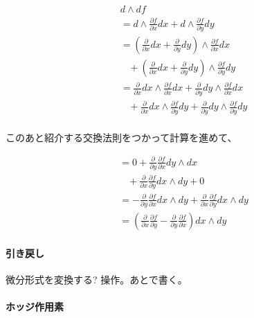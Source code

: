 \begin{equation*}
\begin{split}
&d \wedge df \\
&= d \wedge \frac{\partial f}{\partial x} dx + d \wedge \frac{\partial f}{\partial y} dy \\
&= (\frac{\partial}{\partial x} dx + \frac{\partial}{\partial y} dy) \wedge \frac{\partial f}{\partial x} dx \\
& \; \; \; + (\frac{\partial}{\partial x} dx + \frac{\partial}{\partial y} dy) \wedge \frac{\partial f}{\partial y} dy \\
&= \frac{\partial}{\partial x} dx \wedge \frac{\partial f}{\partial x} dx 
+ \frac{\partial}{\partial y} dy \wedge \frac{\partial f}{\partial x} dx \\
& \; \; \; + \frac{\partial}{\partial x} dx \wedge \frac{\partial f}{\partial y} dy 
+ \frac{\partial}{\partial y} dy \wedge \frac{\partial f}{\partial y} dy \\
\end{split}
\end{equation*}

このあと紹介する交換法則をつかって計算を進めて、

\begin{equation*}
\begin{split}
&= 0 + \frac{\partial}{\partial y} \frac{\partial f}{\partial x} dy \wedge dx \\
& \; \; \; + \frac{\partial}{\partial x} \frac{\partial f}{\partial y} dx \wedge dy + 0 \\
&= - \frac{\partial}{\partial y} \frac{\partial f}{\partial x} dx \wedge dy + \frac{\partial}{\partial x} \frac{\partial f}{\partial y} dx \wedge dy \\
&= ( \frac{\partial}{\partial x} \frac{\partial f}{\partial y} - \frac{\partial}{\partial y} \frac{\partial f}{\partial x} ) dx \wedge dy
\end{split}
\end{equation*}

\paragraph{引き戻し}

微分形式を変換する? 操作。あとで書く。

\paragraph{ホッジ作用素}

